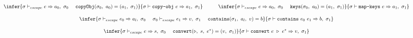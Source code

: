 \documentclass[11pt]{article}
\newcommand{\Term}[1]{\texttt{#1}}
\newcommand{\cs}[0]{\quad}
\newcommand{\symstate}[0]{\sigma}
\newcommand{\evalexpr}[4]{#1 \vdash #2 \Rightarrow #3,\ #4}
\newcommand{\evalescexpr}[4]{#1 \vdash_{escape} #2 \Rightarrow #3,\ #4}
\begin{document}
\[\begin{array}{c}
\\ \\
\multicolumn{1}{c}{\begin{array}{ccc}
\infer
{\evalescexpr{\symstate}{e}{a_0}{\symstate_0}\ \ \ \
\Term{copyObj}(\symstate_0,\ a_0) = (a_1,\ \symstate_1)}
{\evalexpr{\symstate}{\Term{copy-obj}\ e}{a_1}{\symstate_1}}
&
\cs
&
\infer
{\evalescexpr{\symstate}{e}{a_0}{\symstate_0}\ \ \ \
\Term{keys}(\symstate_0,\ a_0) = (a_1,\ \symstate_1)}
{\evalexpr{\symstate}{\Term{map-keys}\ e}{a_1}{\symstate_1}}
\end{array}}
\\ \\
\infer
{\evalescexpr{\symstate}{e_0}{a_l}{\symstate_0}\ \ \ \
\evalescexpr{\symstate_0}{e_1}{v}{\symstate_1}\ \ \ \
\Term{contains}(\symstate_1,\ a_l,\ v) = b}
{\evalexpr{\symstate}{\Term{contains}\ e_0\ e_1}{b}{\symstate_1}}
\\ \\
\infer
{\evalescexpr{\symstate}{e}{s}{\symstate_0}\ \ \ \
\Term{convert}(\triangleright,\ s,\ e^*) = (v,\ \symstate_1)}
{\evalexpr{\symstate}{\Term{convert}\ e\ \triangleright\ e^*}{v}{\symstate_1}}
\end{array}
\]

\newpage
\end{document}

